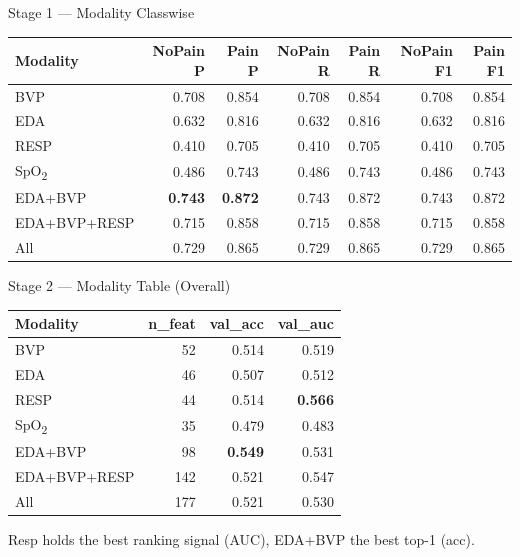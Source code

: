 \documentclass[aspectratio=169,10pt]{beamer}
\begin{document}
\begin{frame}{Stage 1 --- Modality Classwise}
  \centering
  \scriptsize
  \begin{tabular}{lrrrrrr}
    \toprule
    \textbf{Modality} & \textbf{NoPain P} & \textbf{Pain P} & \textbf{NoPain R} & \textbf{Pain R} & \textbf{NoPain F1} & \textbf{Pain F1} \\
    \midrule
    BVP          & 0.708 & 0.854 & 0.708 & 0.854 & 0.708 & 0.854 \\
    EDA          & 0.632 & 0.816 & 0.632 & 0.816 & 0.632 & 0.816 \\
    RESP         & 0.410 & 0.705 & 0.410 & 0.705 & 0.410 & 0.705 \\
    SpO\textsubscript{2} & 0.486 & 0.743 & 0.486 & 0.743 & 0.486 & 0.743 \\
    \rowcolor{green!15} EDA+BVP      & \textbf{0.743} & \textbf{0.872} & 0.743 & 0.872 & 0.743 & 0.872 \\
    EDA+BVP+RESP & 0.715 & 0.858 & 0.715 & 0.858 & 0.715 & 0.858 \\
    All          & 0.729 & 0.865 & 0.729 & 0.865 & 0.729 & 0.865 \\
    \bottomrule
  \end{tabular}
\end{frame}

\begin{frame}{Stage 2 --- Modality Table (Overall)}
  \centering
  \small
  \begin{tabular}{lrrr}
    \toprule
    \textbf{Modality} & \textbf{n\_feat} & \textbf{val\_acc} & \textbf{val\_auc} \\
    \midrule
    BVP          & 52  & 0.514 & 0.519 \\
    EDA          & 46  & 0.507 & 0.512 \\
    \rowcolor{green!15} RESP         & 44  & 0.514 & \textbf{0.566} \\
    SpO\textsubscript{2} & 35  & 0.479 & 0.483 \\
    \rowcolor{yellow!20} EDA+BVP      & 98  & \textbf{0.549} & 0.531 \\
    EDA+BVP+RESP & 142 & 0.521 & 0.547 \\
    All          & 177 & 0.521 & 0.530 \\
    \bottomrule
  \end{tabular}

  \vspace{6pt}
  Resp holds the best ranking signal (AUC), EDA+BVP the best top-1 (acc).
\end{frame}
\end{document}
